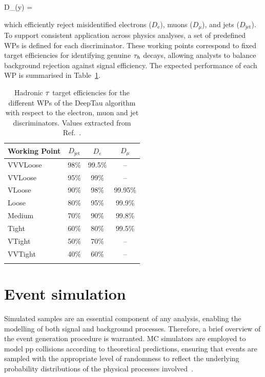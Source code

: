 \begin{equation_pad}
    D_\alpha(y) =  
\end{equation_pad}

which efficiently reject misidentified electrons ($D_\text{e}$), muons ($D_\mu$), and jets ($D_\text{jet}$). To support consistent application across physics analyses, a set of predefined WPs is defined for each discriminator. These working points correspond to fixed target efficiencies for identifying genuine $\tau_h$ decays, allowing analysts to balance background rejection against signal efficiency. The expected performance of each WP is summarised in Table~\ref{Table:Chapter4_DeepTau_WPs}.

\begin{table}[htbp]
\centering
\renewcommand{\arraystretch}{1.5} %
\begin{tabular}{|l|c|c|c|}
\hline
Working Point & $D_{\text{jet}}$ & $D_e$ & $D_\mu$ \\
\hline \hline
VVVLoose & 98\% & 99.5\% & -- \\
\arrayrulecolor{lightgray} \hline
VVLoose  & 95\% & 99\%   & -- \\
\arrayrulecolor{lightgray} \hline
VLoose   & 90\% & 98\%   & 99.95\% \\
\arrayrulecolor{lightgray} \hline
Loose    & 80\% & 95\%   & 99.9\% \\
\arrayrulecolor{lightgray} \hline
Medium   & 70\% & 90\%   & 99.8\% \\
\arrayrulecolor{lightgray} \hline
Tight    & 60\% & 80\%   & 99.5\% \\
\arrayrulecolor{lightgray} \hline
VTight   & 50\% & 70\%   & -- \\
\arrayrulecolor{lightgray} \hline
VVTight  & 40\% & 60\%   & -- \\
\arrayrulecolor{lightgray} \hline
\arrayrulecolor{black} \hline
\end{tabular}
\caption[Hadronic tau target efficiencies for the different working points of the DeepTau algorithm with respect to the electron, muon and jet discriminators]{Hadronic $\tau$ target efficiencies for the different WPs of the DeepTau algorithm with respect to the electron, muon and jet discriminators. Values extracted from Ref.~\cite{DeepTau_20-001}.}
\label{Table:Chapter4_DeepTau_WPs}
\end{table}

\section{Event simulation}
\label{Section:Chapter4_EventSimulation}
Simulated samples are an essential component of any analysis, enabling the modelling of both signal and background processes. Therefore, a brief overview of the event generation procedure is warranted. \ac{MC} simulators are employed to model pp collisions according to theoretical predictions, ensuring that events are sampled with the appropriate level of randomness to reflect the underlying probability distributions of the physical processes involved~\cite{PYTHIA,EventGenerators}.

